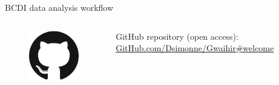 \begin{frame}{BCDI data analysis workflow}
\begin{columns}
    \end{columns}

    \pause
    \begin{columns}
        \vspace{-0.02cm}
        \begin{figure}[T]
            \includegraphics[width=\textwidth]{Figures/gwaihir/GitHub-Mark-120px-plus.png}
        \end{figure}
        
        \medskip
        GitHub repository (open access\footnotemark{}): \href{GitHub.com/Dsimonne/Gwaihir\#welcome}{GitHub.com/Dsimonne/Gwaihir\#welcome}
        
    \end{columns}
    
\end{frame}